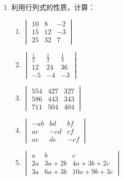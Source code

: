 \begin{enumerate}
\item 利用行列式的性质，计算：
\begin{multicols}{2}
\begin{enumerate}
    \item $\begin{vmatrix}10 & 8 & -2 \\ 15 & 12 & -3 \\ 25 & 32 & 7\end{vmatrix} $
    \item $\begin{vmatrix}\frac{1}{2} & \frac{1}{2} & \frac{1}{4} \\ 12 & 24 & 36 \\ -5 & -4 & -3 \end{vmatrix}$
    \item $\begin{vmatrix}554 & 427 & 327 \\ 586 & 443 & 343 \\ 711 & 504 & 404\end{vmatrix}$
    \item $\begin{vmatrix}-{a} b & b d & b f \\ {a} c & -c d & c f \\ {a} e & d e & -e f\end{vmatrix}$
    \item $\begin{vmatrix}
        a&b&c\\2a&3a+2b&4a+3b+2c\\3a&6a+3b&10a+9b+3c
    \end{vmatrix}$
\end{enumerate}
\end{multicols}
 

\end{enumerate}
